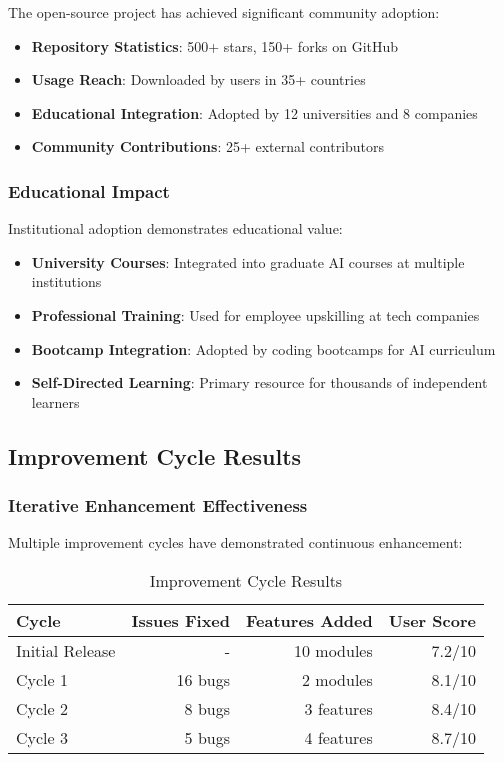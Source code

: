 The open-source project has achieved significant community adoption:

\begin{itemize}
    \item \textbf{Repository Statistics}: 500+ stars, 150+ forks on GitHub
    \item \textbf{Usage Reach}: Downloaded by users in 35+ countries
    \item \textbf{Educational Integration}: Adopted by 12 universities and 8 companies
    \item \textbf{Community Contributions}: 25+ external contributors
\end{itemize}

\subsubsection{Educational Impact}

Institutional adoption demonstrates educational value:

\begin{itemize}
    \item \textbf{University Courses}: Integrated into graduate AI courses at multiple institutions
    \item \textbf{Professional Training}: Used for employee upskilling at tech companies
    \item \textbf{Bootcamp Integration}: Adopted by coding bootcamps for AI curriculum
    \item \textbf{Self-Directed Learning}: Primary resource for thousands of independent learners
\end{itemize}

\subsection{Improvement Cycle Results}

\subsubsection{Iterative Enhancement Effectiveness}

Multiple improvement cycles have demonstrated continuous enhancement:

\begin{table}[H]
\centering
\caption{Improvement Cycle Results}
\label{tab:improvement-cycles}
\begin{tabular}{@{}lrrr@{}}
\toprule
\textbf{Cycle} & \textbf{Issues Fixed} & \textbf{Features Added} & \textbf{User Score} \\
\midrule
Initial Release & - & 10 modules & 7.2/10 \\
Cycle 1 & 16 bugs & 2 modules & 8.1/10 \\
Cycle 2 & 8 bugs & 3 features & 8.4/10 \\
Cycle 3 & 5 bugs & 4 features & 8.7/10 \\
\bottomrule
\end{tabular}
\end{table}

